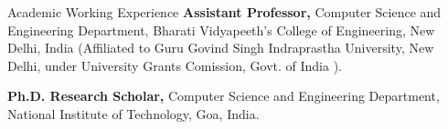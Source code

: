 \begin{rubric}{Academic Working Experience}
	\entry*[2012 -- 2023]%
		\textbf{Assistant Professor,} Computer Science and Engineering Department, Bharati Vidyapeeth's College of Engineering, New Delhi, India (Affiliated to Guru Govind Singh Indraprastha University, New Delhi, under University Grants Comission, Govt. of India ).

	\entry*[2021 -- Present]%
		\textbf{Ph.D. Research Scholar,} Computer Science and Engineering Department, National Institute of Technology, Goa, India.
	
	\end{rubric}